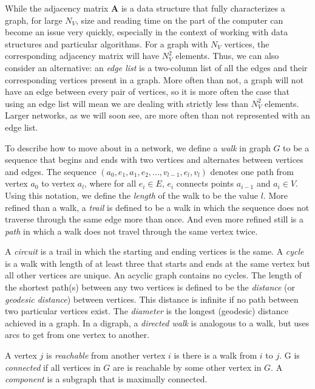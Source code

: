 \documentclass[12pt,twoside]{amherstthesis}
\begin{document}
  While the adjacency matrix \(\textbf{A}\) is a data structure that fully
  characterizes a graph, for large \(N_{V}\), size and reading time on the
  part of the computer can become an issue very quickly, especially in the
  context of working with data structures and particular algorithms. For a
  graph with \(N_{V}\) vertices, the corresponding adjacency matrix will
  have \(N_{V}^{2}\) elements. Thus, we can also consider an alternative:
  an \emph{edge list} is a two-column list of all the edges and their
  corresponding vertices present in a graph. More often than not, a graph
  will not have an edge between every pair of vertices, so it is more
  often the case that using an edge list will mean we are dealing with
  strictly less than \(N_{V}^{2}\) elements. Larger networks, as we will
  soon see, are more often than not represented with an edge list.
  
  To describe how to move about in a network, we define a \emph{walk} in
  graph \(G\) to be a sequence that begins and ends with two vertices and
  alternates between vertices and edges. The sequence
  \((a_0, e_1, a_1, e_2, ..., v_{l-1}, e_l, v_l)\) denotes one path from
  vertex \(a_0\) to vertex \(a_l\), where for all \(e_i \in E\), \(e_i\)
  connects points \(a_{i-1}\) and \(a_i \in V\). Using this notation, we
  define the \emph{length} of the walk to be the value \(l\). More refined
  than a walk, a \emph{trail} is defined to be a walk in which the
  sequence does not traverse through the same edge more than once. And
  even more refined still is a \emph{path} in which a walk does not travel
  through the same vertex twice.
  
  A \emph{circuit} is a trail in which the starting and ending vertices is
  the same. A \emph{cycle} is a walk with length of at least three that
  starts and ends at the same vertex but all other vertices are unique. An
  acyclic graph contains no cycles. The length of the shortest path(s)
  between any two vertices is defined to be the \emph{distance} (or
  \emph{geodesic distance}) between vertices. This distance is infinite if
  no path between two particular vertices exist. The \emph{diameter} is
  the longest (geodesic) distance achieved in a graph. In a digraph, a
  \emph{directed walk} is analogous to a walk, but uses arcs to get from
  one vertex to another.
  
  A vertex \(j\) is \emph{reachable} from another vertex \(i\) is there is
  a walk from \(i\) to \(j\). G is \emph{connected} if all vertices in
  \(G\) are is reachable by some other vertex in \(G\). A \emph{component}
  is a subgraph that is maximally connected.
  
\end{document}
